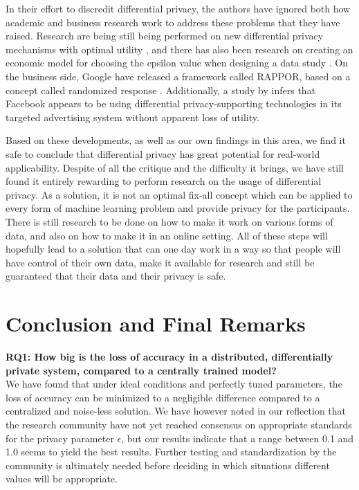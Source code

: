 In their effort to discredit differential privacy, the authors have ignored both how academic and business research work to address these problems that they have raised. Research are being still being performed on new differential privacy mechanisms with optimal utility \citep{eigner2014privada}, and there has also been research on creating an economic model for choosing the epsilon value when designing a data study \citep{hsu2014economicEpsilon}. On the business side, Google have released a framework called RAPPOR, based on a concept called randomized response \citep{erlingsson2014rappor}. Additionally, a study by \cite{chin2012differential} infers that Facebook appears to be using differential privacy-supporting technologies in its targeted advertising system without apparent loss of utility.

Based on these developments, as well as our own findings in this area, we find it safe to conclude that differential privacy has great potential for real-world applicability. Despite of all the critique and the difficulty it brings, we have still found it entirely rewarding to perform research on the usage of differential privacy. As a solution, it is not an optimal fix-all concept which can be applied to every form of machine learning problem and provide privacy for the participants. There is still research to be done on how to make it work on various forms of data, and also on how to make it in an online setting. All of these steps will hopefully lead to a solution that can one day work in a way so that people will have control of their own data, make it available for research and still be guaranteed that their data and their privacy is safe. 
\vspace{10mm}
\section{Conclusion and Final Remarks}
\textbf{RQ1: How big is the loss of accuracy in a distributed, differentially private system, compared to a centrally trained model?} \\
We have found that under ideal conditions and perfectly tuned parameters, the loss of accuracy can be minimized to a negligible difference compared to a centralized and noise-less solution. We have however noted in our reflection that the research community have not yet reached consensus on appropriate standards for the privacy parameter $\epsilon$, but our results indicate that a range between 0.1 and 1.0 seems to yield the best results. Further testing and standardization by the community is ultimately needed before deciding in which situations different values will be appropriate.

